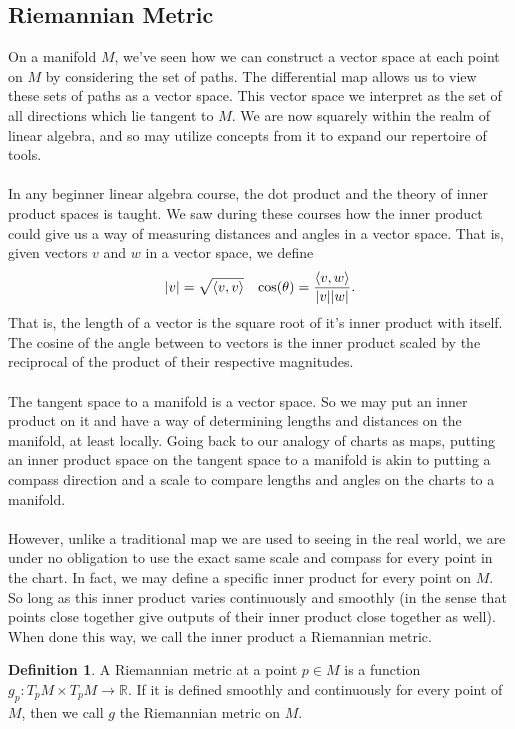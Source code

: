 \documentclass[]{article}
\newcommand\<{\ensuremath{\left\langle}}
\renewcommand\>{\ensuremath{\right\rangle}}
\newcommand{\RR}{\ensuremath{\mathbb{R}}}
\theoremstyle{definition}
\newtheorem{definition}{Definition}[section]
\theoremstyle{definition}
\begin{document}
	\subsection*{Riemannian Metric}
	On a manifold $M$, we've seen how we can construct a vector space at each point on $M$ by considering the set of paths. The differential map allows us to view these sets of paths as a vector space. This vector space we interpret as the set of all directions which lie tangent to $M$. We are now squarely within the realm of linear algebra, and so may utilize concepts from it to expand our repertoire of tools.\\
	\\
	In any beginner linear algebra course, the dot product and the theory of inner product spaces is taught. We saw during these courses how the inner product could give us a way of measuring distances and angles in a vector space. That is, given vectors $v$ and $w$ in a vector space, we define
	\begin{align*}
		|v| = \sqrt{\<v,v\>} && \cos(\theta) = \frac{\<v,w\>}{|v||w|}.
	\end{align*}
	That is, the length of a vector is the square root of it's inner product with itself. The cosine of the angle between to vectors is the inner product scaled by the reciprocal of the product of their respective magnitudes.\\
	\\
	The tangent space to a manifold is a vector space. So we may put an inner product on it and have a way of determining lengths and distances on the manifold, at least locally. Going back to our analogy of charts as maps, putting an inner product space on the tangent space to a manifold is akin to putting a compass direction and a scale to compare lengths and angles on the charts to a manifold.\\
	\\
	However, unlike a traditional map we are used to seeing in the real world, we are under no obligation to use the exact same scale and compass for every point in the chart. In fact, we may define a specific inner product for every point on $M$. So long as this inner product varies continuously and smoothly (in the sense that points close together give outputs of their inner product close together as well). When done this way, we call the inner product a Riemannian metric.
	\begin{definition}
		A Riemannian metric at a point $p \in M$ is a function $g_p : T_pM \times T_pM \to \RR$. If it is defined smoothly and continuously for every point of $M$, then we call $g$ the Riemannian metric on $M$. \cite{Lee2018}
	\end{definition}
	
\end{document}
